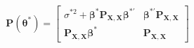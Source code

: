 \begin{equation}
	\mathbf{P} \left( \boldsymbol{\theta}^{\ast} \right)
	=
	\left[
		\begin{array}{c|c}
			\sigma^{\ast2} + \boldsymbol{\beta}^{\ast} \mathbf{P}_{\mathbf{X}, \mathbf{X}} \boldsymbol{\beta}^{\ast\prime} & \boldsymbol{\beta}^{\ast\prime} \mathbf{P}_{\mathbf{X}, \mathbf{X}} \\
			\hline
			\mathbf{P}_{\mathbf{X}, \mathbf{X}} \boldsymbol{\beta}^{\ast}                                                  & \mathbf{P}_{\mathbf{X}, \mathbf{X}}                                 
		\end{array}
	\right]
	\label{eq:strRegression-rhocap-of-thetastar}
\end{equation}
